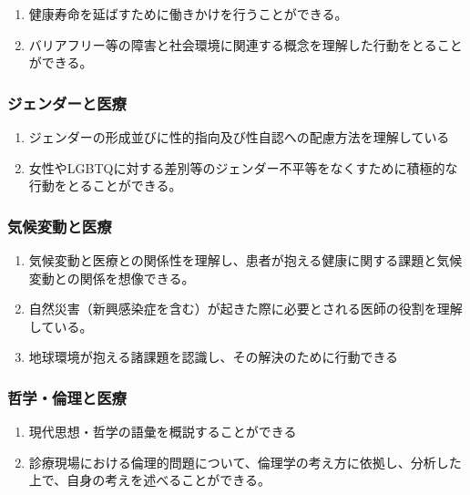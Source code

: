 \documentclass[
]{ltjsarticle}
\providecommand{\tightlist}{%
  \setlength{\itemsep}{0pt}\setlength{\parskip}{0pt}}
\begin{document}
\begin{enumerate}
\def\labelenumi{\arabic{enumi}.}
\tightlist
\item
  健康寿命を延ばすために働きかけを行うことができる。
\item
  バリアフリー等の障害と社会環境に関連する概念を理解した行動をとることができる。
\end{enumerate}

\hypertarget{ux30b8ux30a7ux30f3ux30c0ux30fcux3068ux533bux7642}{%
\subsubsection{ジェンダーと医療}\label{ux30b8ux30a7ux30f3ux30c0ux30fcux3068ux533bux7642}}

\begin{enumerate}
\def\labelenumi{\arabic{enumi}.}
\tightlist
\item
  ジェンダーの形成並びに性的指向及び性自認への配慮方法を理解している
\item
  女性やLGBTQに対する差別等のジェンダー不平等をなくすために積極的な行動をとることができる。
\end{enumerate}

\hypertarget{ux6c17ux5019ux5909ux52d5ux3068ux533bux7642}{%
\subsubsection{気候変動と医療}\label{ux6c17ux5019ux5909ux52d5ux3068ux533bux7642}}

\begin{enumerate}
\def\labelenumi{\arabic{enumi}.}
\tightlist
\item
  気候変動と医療との関係性を理解し、患者が抱える健康に関する課題と気候変動との関係を想像できる。
\item
  自然災害（新興感染症を含む）が起きた際に必要とされる医師の役割を理解している。
\item
  地球環境が抱える諸課題を認識し、その解決のために行動できる
\end{enumerate}

\hypertarget{ux54f2ux5b66ux502bux7406ux3068ux533bux7642}{%
\subsubsection{哲学・倫理と医療}\label{ux54f2ux5b66ux502bux7406ux3068ux533bux7642}}

\begin{enumerate}
\def\labelenumi{\arabic{enumi}.}
\tightlist
\item
  現代思想・哲学の語彙を概説することができる
\item
  診療現場における倫理的問題について、倫理学の考え方に依拠し、分析した上で、自身の考えを述べることができる。
\end{enumerate}
\end{document}
